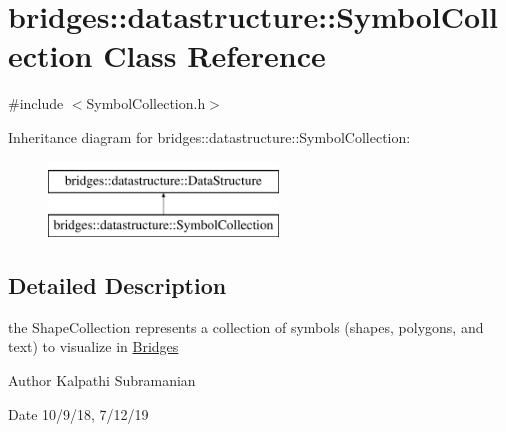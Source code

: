 \hypertarget{classbridges_1_1datastructure_1_1_symbol_collection}{}\section{bridges\+:\+:datastructure\+:\+:Symbol\+Collection Class Reference}
\label{classbridges_1_1datastructure_1_1_symbol_collection}


{\ttfamily \#include $<$Symbol\+Collection.\+h$>$}

Inheritance diagram for bridges\+:\+:datastructure\+:\+:Symbol\+Collection\+:\begin{figure}[H]
\begin{center}
\leavevmode
\includegraphics[height=2.000000cm]{classbridges_1_1datastructure_1_1_symbol_collection}
\end{center}
\end{figure}


\subsection{Detailed Description}
the Shape\+Collection represents a collection of symbols (shapes, polygons, and text) to visualize in \hyperlink{classbridges_1_1_bridges}{Bridges} 

\begin{DoxyAuthor}{Author}
Kalpathi Subramanian 
\end{DoxyAuthor}
\begin{DoxyDate}{Date}
10/9/18, 7/12/19 
\end{DoxyDate}
